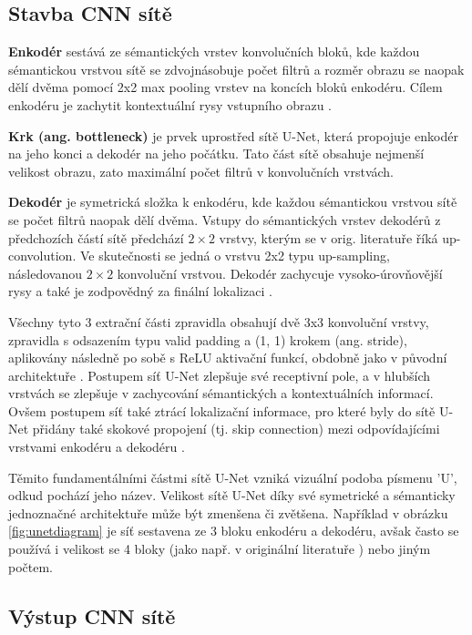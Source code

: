 \subsection{Stavba CNN sítě}
\label{subsec:Chapter221}

\textbf{Enkodér} sestává ze sémantických vrstev konvolučních bloků, kde každou sémantickou vrstvou sítě se zdvojnásobuje počet filtrů a rozměr obrazu se naopak dělí dvěma pomocí 2x2 max pooling vrstev na koncích bloků enkodéru. Cílem enkodéru je zachytit kontextuální rysy vstupního obrazu \cite{unet_success}.

\textbf{Krk (ang. bottleneck)} je prvek uprostřed sítě U-Net, která propojuje enkodér na jeho konci a dekodér na jeho počátku. Tato část sítě obsahuje nejmenší velikost obrazu, zato maximální počet filtrů v konvolučních vrstvách.

\textbf{Dekodér} je symetrická složka k enkodéru, kde každou sémantickou vrstvou sítě se počet filtrů naopak dělí dvěma. Vstupy do sémantických vrstev dekodérů z předchozích částí sítě předchází $2\times2$ vrstvy, kterým se v orig. literatuře říká up-convolution. Ve skutečnosti se jedná o vrstvu 2x2 typu up-sampling, následovanou $2\times2$ konvoluční vrstvou. Dekodér zachycuje vysoko-úrovňovější rysy a také je zodpovědný za finální lokalizaci \cite{unet_success}.

Všechny tyto 3 extrační části zpravidla obsahují dvě 3x3 konvoluční vrstvy, zpravidla s odsazením typu valid padding a (1, 1) krokem (ang. stride), aplikovány následně po sobě s ReLU aktivační funkcí, obdobně jako v původní architektuře \cite{unet}. Postupem síť U-Net zlepšuje své receptivní pole, a v hlubších vrstvách se zlepšuje v zachycování sémantických a kontextuálních informací. Ovšem postupem síť také ztrácí lokalizační informace, pro které byly do sítě U-Net přidány také skokové propojení (tj. skip connection) mezi odpovídajícími vrstvami enkodéru a dekodéru \cite{unet_success}.

Těmito fundamentálními částmi sítě U-Net vzniká vizuální podoba písmenu 'U', odkud pochází jeho název. Velikost sítě U-Net díky své symetrické a sémanticky jednoznačné architektuře může být zmenšena či zvětšena. Například v obrázku \ref{fig:unetdiagram} je síť sestavena ze 3 bloku enkodéru a dekodéru, avšak často se používá i velikost se 4 bloky (jako např. v originální literatuře \cite{unet}) nebo jiným počtem.

\subsection{Výstup CNN sítě}
\label{subsec:Chapter222}

